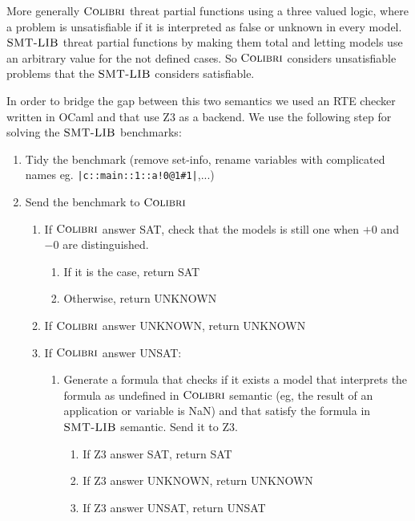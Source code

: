 \documentclass[a4paper]{article}
\newcommand{\COLIBRI}{\ensuremath{\mbox{\scshape Colibri}}\xspace}
\newcommand{\SMTLIB}{\ensuremath{\mbox{\scshape SMT-LIB}}\xspace}
\begin{document}
More generally \COLIBRI threat partial functions using a three valued
logic, where a problem is unsatisfiable if it is interpreted as false
or unknown in every model. \SMTLIB threat partial functions by making
them total and letting models use an arbitrary value for the not
defined cases. So \COLIBRI considers unsatisfiable problems that the
\SMTLIB considers satisfiable.

In order to bridge the gap between this two semantics we used an RTE
checker written in OCaml and that use Z3 as a backend. We use the
following step for solving the \SMTLIB benchmarks:

\begin{enumerate}
\item Tidy the benchmark (remove set-info, rename variables with complicated
  names eg. \verb&|c::main::1::a!0@1#1|&,...)
\item Send the benchmark to \COLIBRI
  \begin{enumerate}
  \item If \COLIBRI answer SAT, check that the models is still one
    when $+0$ and $-0$ are distinguished.
    \begin{enumerate}
    \item If it is the case, return SAT
    \item Otherwise, return UNKNOWN
    \end{enumerate}
  \item If \COLIBRI answer UNKNOWN, return UNKNOWN
  \item If \COLIBRI answer UNSAT:
    \begin{enumerate}
    \item Generate a formula that checks if it exists a model that
      interprets the formula as undefined in \COLIBRI semantic (eg,
      the result of an application or variable is NaN) and that
      satisfy the formula in \SMTLIB semantic. Send it
      to Z3.
      \begin{enumerate}
      \item If Z3 answer SAT, return SAT
      \item If Z3 answer UNKNOWN, return UNKNOWN
      \item If Z3 answer UNSAT, return UNSAT
      \end{enumerate}
    \end{enumerate}
  \end{enumerate}
\end{enumerate}




\end{document}
